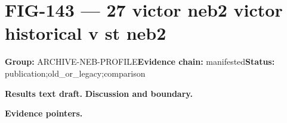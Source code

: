 \clearpage
\section{FIG-143 --- 27 victor neb2 victor historical v st neb2}
\label{figpage:fig-143}
\textbf{Group:} ARCHIVE-NEB-PROFILE\quad \textbf{Evidence chain:} manifested\quad \textbf{Status:} publication;old\_or\_legacy;comparison

\textbf{Results text draft.} 
\textbf{Discussion and boundary.} 


\textbf{Evidence pointers.}



\vfill
